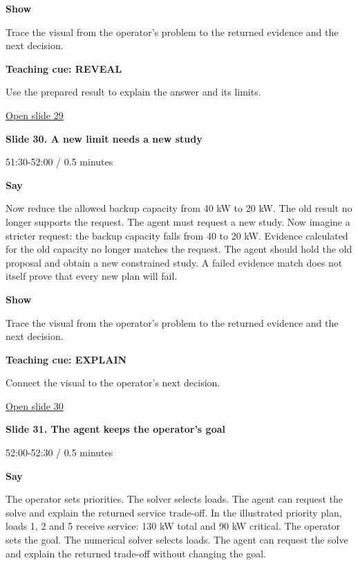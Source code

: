 \documentclass[12pt,letterpaper]{article}
\begin{document}
\textbf{Show}\par Trace the visual from the operator's problem to the returned evidence and the next decision.\par\medskip
\textbf{Teaching cue: REVEAL}\par Use the prepared result to explain the answer and its limits.\par\medskip
\vfill\href{https://alaaselim-sudo.github.io/GridGuard-Agentic-AI-Tutorials/operator-cases/#/29}{Open slide 29}\par
\clearpage{}
{\Large\bfseries\color{IEEEBlue} Slide 30. A new limit needs a new study\par}\medskip
{\small\color{Slate} 51:30-52:00 /\allowbreak{} 0.5 minutes\par}\medskip
\textbf{Say}\par Now reduce the allowed backup capacity from 40 kW to 20 kW. The old result no longer supports the request. The agent must request a new study. Now imagine a stricter request: the backup capacity falls from 40 to 20 kW. Evidence calculated for the old capacity no longer matches the request. The agent should hold the old proposal and obtain a new constrained study. A failed evidence match does not itself prove that every new plan will fail.\par\medskip
\textbf{Show}\par Trace the visual from the operator's problem to the returned evidence and the next decision.\par\medskip
\textbf{Teaching cue: EXPLAIN}\par Connect the visual to the operator's next decision.\par\medskip
\vfill\href{https://alaaselim-sudo.github.io/GridGuard-Agentic-AI-Tutorials/operator-cases/#/30}{Open slide 30}\par
\clearpage{}
{\Large\bfseries\color{IEEEBlue} Slide 31. The agent keeps the operator's goal\par}\medskip
{\small\color{Slate} 52:00-52:30 /\allowbreak{} 0.5 minutes\par}\medskip
\textbf{Say}\par The operator sets priorities. The solver selects loads. The agent can request the solve and explain the returned service trade-off. In the illustrated priority plan, loads 1, 2 and 5 receive service: 130 kW total and 90 kW critical. The operator sets the goal. The numerical solver selects loads. The agent can request the solve and explain the returned trade-off without changing the goal.\par\medskip
\end{document}
